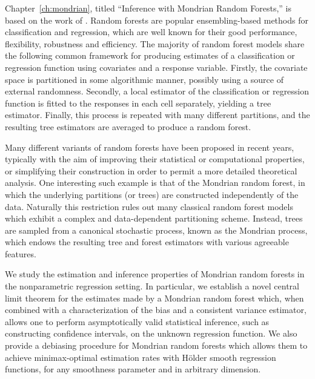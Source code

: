 Chapter~\ref{ch:mondrian}, titled ``Inference with Mondrian Random Forests,''
is based on the work of \citet{cattaneo2023inference}.
Random forests are popular ensembling-based methods for classification and
regression, which are well known for their good performance, flexibility,
robustness and efficiency. The majority of random forest models share the
following common framework for producing estimates of a classification or
regression function using covariates and a response variable. Firstly, the
covariate space is partitioned in some algorithmic manner, possibly using a
source of external randomness. Secondly, a local estimator of the
classification or regression function is fitted to the responses in each cell
separately, yielding a tree estimator. Finally, this process is repeated with
many different partitions, and the resulting tree estimators are averaged to
produce a random forest.

Many different variants of random forests have been proposed in recent years,
typically with the aim of improving their statistical or computational
properties, or simplifying their construction in order to permit a more
detailed theoretical analysis.
One interesting such example is that of the Mondrian random forest, in which
the underlying partitions (or trees) are constructed independently of the data.
Naturally this restriction rules out many classical random forest models which
exhibit a complex and data-dependent partitioning scheme. Instead, trees are
sampled from a canonical stochastic process, known as the Mondrian process,
which endows the resulting tree and forest estimators with various agreeable
features.

We study the estimation and inference properties of Mondrian
random forests in the nonparametric regression setting. In particular, we
establish a novel central limit theorem for the estimates made by a Mondrian
random forest which, when combined with a characterization of the bias and a
consistent variance estimator, allows one to perform asymptotically valid
statistical inference, such as constructing confidence intervals, on the
unknown regression function. We also provide a debiasing procedure for Mondrian
random forests which allows them to achieve minimax-optimal estimation rates
with H{\"o}lder smooth regression functions, for any smoothness parameter and
in arbitrary dimension.

